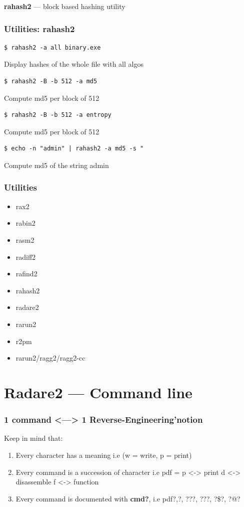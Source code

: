 \documentclass[10pt,pdf,utf8,english,compress,hyperref={unicode}]{beamer}
\begin{document}
\begin{frame}[fragile]
  \center\textbf{rahash2} — block based hashing utility
  \noindent\makebox[\linewidth]{\rule{\paperwidth}{0.4pt}}
  \frametitle{Utilities: rahash2}
  \begin{verbatim}$ rahash2 -a all binary.exe\end{verbatim}
  \alert{Display hashes of the whole file with all algos}
  \begin{verbatim}$ rahash2 -B -b 512 -a md5\end{verbatim}
  \alert{Compute md5 per block of 512}
  \begin{verbatim}$ rahash2 -B -b 512 -a entropy\end{verbatim}
  \alert{Compute md5 per block of 512}
  \begin{verbatim}$ echo -n "admin" | rahash2 -a md5 -s "\end{verbatim}
  \alert{Compute md5 of the string admin}

\end{frame}

\begin{frame}[fragile]
  \frametitle{Utilities}
     \begin{itemize}
        \item rax2
        \item rabin2
        \item rasm2
        \item radiff2
        \item rafind2
        \item rahash2
        \item \alert{radare2}
        \item rarun2
				\item r2pm
        \item rarun2/ragg2/ragg2-cc
      \end{itemize}
\end{frame}

\section{Radare2 — Command line}

\begin{frame}[fragile]
  \frametitle{1 command <—> 1 Reverse-Engineering'notion}
  Keep in mind that:
  \begin{enumerate}
  \item Every character has a meaning i.e \alert{(w = write, p = print)}
  \item Every command is a succession of character i.e \alert{pdf = p <-> print d <-> disassemble f <-> function }
  \item Every command is documented with \textbf{cmd?}, i.e \alert{pdf?},\alert{?}, \alert{???}, \alert{???}, \alert{?\$?}, \alert{?@?}
  \end{enumerate}
\end{frame}
\end{document}
